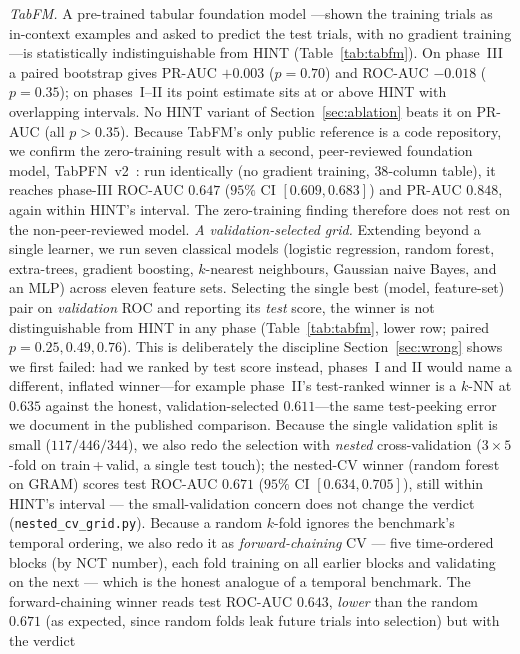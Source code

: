 \documentclass[a4paper,fleqn]{cas-sc}
\begin{document}
\emph{TabFM.} A pre-trained tabular foundation model \citep{google2026tabfm}---shown the training
trials as in-context examples and asked to predict the test trials, with no gradient
training---is statistically indistinguishable from HINT (Table~\ref{tab:tabfm}). On phase~III
a paired bootstrap gives PR-AUC $+0.003$ ($p=0.70$) and ROC-AUC $-0.018$ ($p=0.35$); on
phases~I--II its point estimate sits at or above HINT with overlapping intervals. No HINT
variant of Section~\ref{sec:ablation} beats it on PR-AUC (all $p>0.35$). Because TabFM's only
public reference is a code repository, we confirm the zero-training result with a second,
peer-reviewed foundation model, TabPFN~v2~\citep{hollmann2025tabpfn}: run identically (no
gradient training, $38$-column table), it reaches phase-III ROC-AUC $0.647$ ($95\%$ CI
$[0.609,0.683]$) and PR-AUC $0.848$, again within HINT's interval. The zero-training finding
therefore does not rest on the non-peer-reviewed model.
\emph{A validation-selected grid.} Extending beyond a single learner, we run seven classical
models (logistic regression, random forest, extra-trees, gradient boosting, $k$-nearest
neighbours, Gaussian naive Bayes, and an MLP) across eleven feature sets. Selecting the single
best (model, feature-set) pair on \emph{validation} ROC and reporting its \emph{test} score,
the winner is not distinguishable from HINT in any phase (Table~\ref{tab:tabfm}, lower
row; paired $p=0.25,0.49,0.76$). This is deliberately the discipline Section~\ref{sec:wrong}
shows we first failed: had we ranked by test score instead, phases~I and II would name a
different, inflated winner---for example phase~II's test-ranked winner is a $k$-NN at $0.635$
against the honest, validation-selected $0.611$---the same test-peeking error we document in
the published comparison. Because the single validation split is small ($117/446/344$), we
also redo the selection with \emph{nested} cross-validation ($3{\times}5$-fold on
train\,+\,valid, a single test touch); the nested-CV winner (random forest on GRAM) scores
test ROC-AUC $0.671$ ($95\%$ CI $[0.634,0.705]$), still within HINT's interval --- the
small-validation concern does not change the verdict (\texttt{nested\_cv\_grid.py}). Because a
random $k$-fold ignores the benchmark's temporal ordering, we also redo it as
\emph{forward-chaining} CV --- five time-ordered blocks (by NCT number), each fold training on
all earlier blocks and validating on the next --- which is the honest analogue of a temporal
benchmark. The forward-chaining winner reads test ROC-AUC $0.643$, \emph{lower} than the random
$0.671$ (as expected, since random folds leak future trials into selection) but with the verdict
\end{document}
